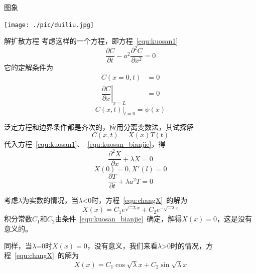 \documentclass[xcolor=dvipsnames]{beamer}
\begin{document}
\begin{frame}{图象}
\begin{center}
\texttt{[image: ./pic/duiliu.jpg]}
\end{center}
\end{frame}
\begin{frame}{解扩散方程}
考虑这样的一个方程，即方程~\ref{equ:kuosan1}
\begin{equation}\label{equ:kuosan1}
	\dfrac{\partial C}{\partial t}-a^2\dfrac{\partial^2 C}{\partial x^2}=0
\end{equation}
它的定解条件为
\begin{equation}
\begin{aligned}\label{equ:kuosan_bianjie}
C(x=0,t)&=0\\
\left.\dfrac{\partial C}{\partial x}\right|_{x=L}&=0
\end{aligned}
\end{equation}
\begin{equation}\label{equ:kuosan_chushi}
\left.C(x,t)\right|_{t=0}=\psi(x)
\end{equation}\par
\end{frame}
\begin{frame}
泛定方程和边界条件都是齐次的，应用分离变数法，其试探解
\begin{equation}
	C(x,t)=X(x)T(t)
\end{equation}
代入方程~\ref{equ:kuosan1}、~\ref{equ:kuosan_bianjie}，得
\begin{equation}\label{equ:changX}
	\dfrac{\partial^2 X}{\partial x}+\lambda X=0
\end{equation}
\begin{equation}
	X(0)=0,X'(l)=0
\end{equation}
\begin{equation}
	\dfrac{\partial T}{\partial t}+\lambda a^2 T=0
\end{equation}
\end{frame}
\begin{frame}
考虑$\lambda$为实数的情况，当$\lambda$<0时，方程~\ref{equ:changX}~的解为
\begin{equation}
	X(x)=C_1e^{\sqrt{-\lambda}x}+C_2e^{-\sqrt{-\lambda}x}
\end{equation}
积分常数$C_1$和$C_2$由条件~\ref{equ:kuosan_bianjie}~确定，解得$X(x)=0$，这是没有意义的。\par
同样，当$\lambda$=0时$X(x)=0$，没有意义，我们来看$\lambda$>0时的情况，方程~\ref{equ:changX}~的解为
\begin{equation}
X(x)=C_1\cos \sqrt{\lambda}x+C_2\sin \sqrt{\lambda}x
\end{equation}
\end{frame}
\end{document}
